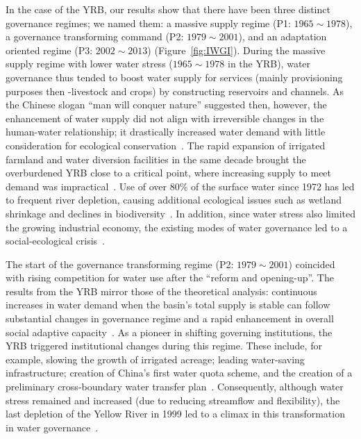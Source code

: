 \documentclass[draft]{agujournal2019}
\begin{document}
In the case of the YRB, our results show that there have been three distinct governance regimes; we named them: a massive supply regime (P1: $1965 \sim 1978$), a governance transforming command (P2: $1979 \sim 2001$), and an adaptation oriented regime (P3: $2002 \sim 2013$) (Figure~\ref{fig:IWGI}).
During the massive supply regime with lower water stress ($1965 \sim 1978$ in the YRB), water governance thus tended to boost water supply for services (mainly provisioning purposes then -livestock and crops) by constructing reservoirs and channels.
As the Chinese slogan ``man will conquer nature'' suggested then, however, the enhancement of water supply did not align with irreversible changes in the human-water relationship; it drastically increased water demand with little consideration for ecological conservation~\cite{zhou2020}.
The rapid expansion of irrigated farmland and water diversion facilities in the same decade brought the overburdened YRB close to a critical point, where increasing supply to meet demand was impractical~\cite{loch2020}.
Use of over $80\%$ of the surface water since 1972 has led to frequent river depletion, causing additional ecological issues such as wetland shrinkage and declines in biodiversity~\cite{wang2019c}.
In addition, since water stress also limited the growing industrial economy, the existing modes of water governance led to a social-ecological crisis~\cite{wohlfart2016a}.

The start of the governance transforming regime (P2: $1979 \sim 2001$) coincided with rising competition for water use after the ``reform and opening-up''.
The results from the YRB mirror those of the theoretical analysis: continuous increases in water demand when the basin's total supply is stable can follow substantial changes in governance regime and a rapid enhancement in overall social adaptive capacity~\cite{loch2020}.
As a pioneer in shifting governing institutions, the YRB triggered institutional changes during this regime. These include, for example, slowing the growth of irrigated acreage; leading water-saving infrastructure; creation of China's first water quota scheme, and the creation of a preliminary cross-boundary water transfer plan~\cite{wang2019e,long2020,nickum2021}.
Consequently, although water stress remained and increased (due to reducing streamflow and flexibility), the last depletion of the Yellow River in 1999 led to a climax in this transformation in water governance~\cite{wang2019e}.
\end{document}
